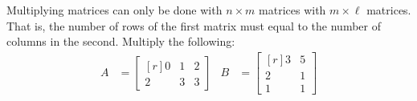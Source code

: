 \documentclass[crop=false,class=article]{standalone}                           %
\begin{document}
        \newpage
        \begin{problem}
            Multiplying matrices can only be done with $n\times{m}$ matrices
            with $m\times\ell$ matrices. That is, the number of rows of the
            first matrix must equal to the number of columns in the second.
            Multiply the following:
            \begin{align*}
                A&=
                \begin{bmatrix*}[r]
                    0&1&2\\
                    2&3&3
                \end{bmatrix*}
                &
                B&=
                \begin{bmatrix*}[r]
                    3&5\\
                    2&1\\
                    1&1
                \end{bmatrix*}
            \end{align*}
            \par\hfill\par
        \end{problem}
\end{document}
